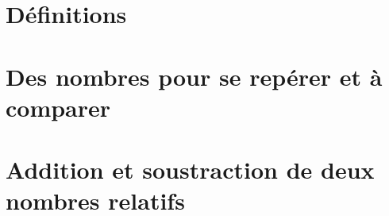 \documentclass[12pt,a4paper]{article}
\date{}
\title{}
\begin{document}







\section{Définitions}




\section{Des nombres pour se repérer et à comparer}


 \newpage
 
\section{Addition et soustraction de deux nombres relatifs}


\end{document}
